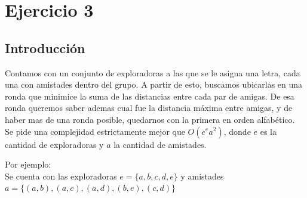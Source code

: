 
\section{Ejercicio 3}
\subsection{Introducción}
Contamos con un conjunto de exploradoras a las que se le asigna una letra, cada una con amistades dentro del grupo. 
A partir de esto, buscamos ubicarlas en una ronda que minimice la suma de las distancias entre cada par de amigas.
De esa ronda queremos saber ademas cual fue la distancia máxima entre amigas, y de haber mas de una ronda posible, quedarnos con la primera en orden alfabético.\\
Se pide una complejidad estrictamente mejor que $O(e^ea^2) $, donde $e$ es la cantidad de exploradoras y $a$ la cantidad de amistades.

Por ejemplo:
\\
Se cuenta con las exploradoras  $e = \{a, b, c, d, e\} $  y amistades  $a = \{ (a,b), (a,c), (a,d), (b,e), (c,d) \} $ 

